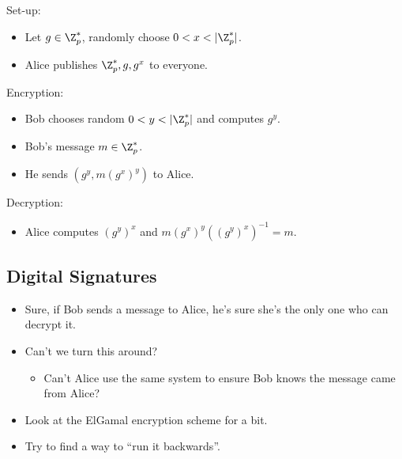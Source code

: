 \begin{frame}
  \begin{definition}
    Set-up:
    \begin{itemize}
      \item Let \(g\in \Z_p^*\), randomly choose \(0 < x < |\Z_p^*|\).
      \item Alice publishes \(\Z_p^*, g, g^x\) to everyone.
    \end{itemize}
    Encryption:
    \begin{itemize}
      \item Bob chooses random \(0 < y < |\Z_p^*|\) and computes \(g^y\).
      \item Bob's message \(m\in \Z_p^*\).
      \item He sends \((g^y, m(g^{x})^y)\) to Alice.
    \end{itemize}
    Decryption:
    \begin{itemize}
      \item Alice computes \((g^y)^x\) and \(m(g^x)^y((g^{y})^x)^{-1} = m\).
    \end{itemize}
  \end{definition}
\end{frame}

\subsection{Digital Signatures}

\begin{frame}
  \begin{idea}
    \begin{itemize}
      \item Sure, if Bob sends a message to Alice, he's sure she's the only one
        who can decrypt it.

        \pause{}

      \item Can't we turn this around?
        \begin{itemize}
          \item Can't Alice use the same system to ensure Bob knows the message
            came from Alice?
        \end{itemize}
    \end{itemize}
  \end{idea}

  \pause{}

  \begin{exercise}
    \begin{itemize}
      \item Look at the ElGamal encryption scheme for a bit.
      \item Try to find a way to \enquote{run it backwards}.
    \end{itemize}
  \end{exercise}
\end{frame}

